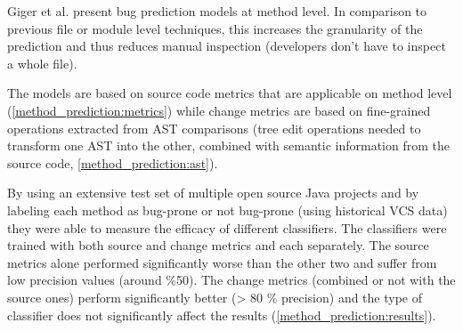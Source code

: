 \documentclass{article}
\begin{document}
 Giger et al. \cite{prediction_method} present bug prediction models at method level. In comparison to previous file or module level techniques, this increases the granularity of the prediction and thus reduces manual inspection (developers don't have to inspect a whole file). 

 The models are based on source code metrics that are applicable on method level (\cref{method_prediction:metrics}) while change metrics are based on fine-grained operations extracted from AST comparisons (tree edit operations needed to transform one AST into the other, combined with semantic information from the source code, \cref{method_prediction:ast}).

 By using an extensive test set of multiple open source Java projects and by labeling each method as bug-prone or not bug-prone (using historical VCS data) they were able to measure the efficacy of different classifiers. The classifiers were trained with both source and change metrics and each separately. The source metrics alone performed significantly worse than the other two and suffer from low precision values (around \%50). The change metrics (combined or not with the source ones) perform significantly better (> 80 \% precision) and the type of classifier does not significantly affect the results (\cref{method_prediction:results}).
\end{document}
